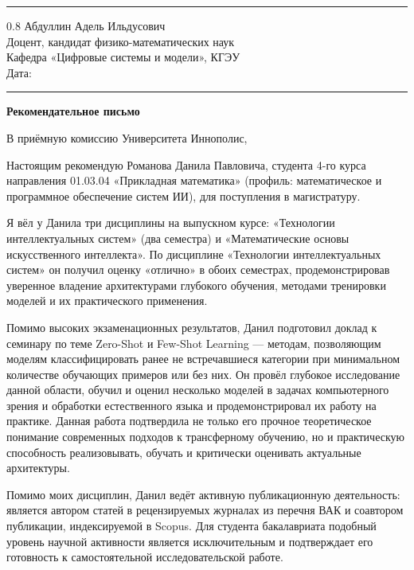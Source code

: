 \documentclass[a4paper,12pt]{article}
\begin{document}
\vspace{4pt}
\noindent\rule{\textwidth}{0.8pt}

\begin{flushright}
  \begin{spacing}{0.8}
    Абдуллин Адель Ильдусович\\
    Доцент, кандидат физико-математических наук\\
    Кафедра «Цифровые системы и модели», КГЭУ\\[6pt]
    Дата: \rule{4cm}{0.4pt}
  \end{spacing}
\end{flushright}

\begin{center}
  {\Large\bfseries Рекомендательное письмо}
\end{center}

В приёмную комиссию Университета Иннополис,

Настоящим рекомендую Романова Данила Павловича, студента 4-го курса направления 01.03.04 «Прикладная математика» (профиль: ма\-те\-ма\-ти\-че\-ское и про\-грамм\-ное обес\-пе\-че\-ние систем ИИ), для по\-сту\-пле\-ния в ма\-ги\-стра\-ту\-ру.

Я вёл у Данила три дисциплины на выпускном курсе: «Технологии интеллектуальных систем» (два семестра) и «Математические основы искусственного интеллекта». По дисциплине «Технологии интеллектуальных систем» он получил оценку «отлично» в обоих семестрах, продемонстрировав уверенное владение архитектурами глубокого обучения, методами тренировки моделей и их практического применения.

Помимо высоких экзаменационных результатов, Данил подготовил доклад к семинару по теме Zero-Shot и Few-Shot Learning --- методам, позволяющим моделям классифицировать ранее не встречавшиеся категории при минимальном количестве обучающих примеров или без них. Он провёл глубокое исследование данной области, обучил и оценил несколько моделей в задачах компьютерного зрения и обработки естественного языка и продемонстрировал их работу на практике. Данная работа подтвердила не только его прочное теоретическое понимание современных подходов к трансферному обучению, но и практическую способность реализовывать, обучать и критически оценивать актуальные архитектуры.

Помимо моих дисциплин, Данил ведёт активную публикационную деятельность: является автором статей в рецензируемых журналах из перечня ВАК и соавтором публикации, индексируемой в Scopus. Для студента бакалавриата подобный уровень научной активности является исключительным и подтверждает его готовность к самостоятельной исследовательской работе.
\end{document}
